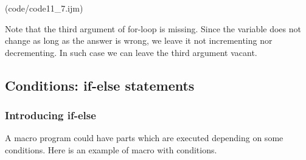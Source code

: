 (code/code11_7.ijm)

Note that the third argument of for-loop is missing. Since the variable
 does not change as long as the answer is wrong, we leave it not
incrementing nor decrementing. In such case we can leave the third argument
vacant.

\subsection{Conditions: if-else statements}

\subsubsection{Introducing if-else}
A macro program could have parts which are executed depending on some
conditions.
Here is an example of macro with conditions.